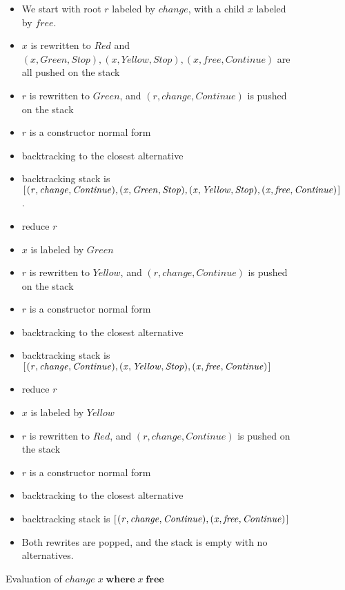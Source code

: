 \documentclass{book}
\theoremstyle{definition}
\newcommand{\Conid}[1]{\mathit{#1}}
\newcommand{\Varid}[1]{\mathit{#1}}
\begin{document}
\begin{figure}
\begin{itemize}
   \item We start with root \ensuremath{\Varid{r}} labeled by \ensuremath{\Varid{change}}, with a child \ensuremath{\Varid{x}} labeled by \ensuremath{\Varid{free}}.
   \item \ensuremath{\Varid{x}} is rewritten to \ensuremath{\Conid{Red}} and \ensuremath{(\Varid{x},\Conid{Green},\Conid{Stop}),(\Varid{x},\Conid{Yellow},\Conid{Stop}),(\Varid{x},\Varid{free},\Conid{Continue})} 
         are all pushed on the stack
   \item \ensuremath{\Varid{r}} is rewritten to \ensuremath{\Conid{Green}}, and \ensuremath{(\Varid{r},\Varid{change},\Conid{Continue})} is pushed on the stack
   \item \ensuremath{\Varid{r}} is a constructor normal form
   \item backtracking to the closest alternative
   \item backtracking stack is 
         \ensuremath{[\mskip1.5mu (\Varid{r},\Varid{change},\Conid{Continue}),(\Varid{x},\Conid{Green},\Conid{Stop}),(\Varid{x},\Conid{Yellow},\Conid{Stop}),(\Varid{x},\Varid{free},\Conid{Continue})\mskip1.5mu]}.
   \item reduce \ensuremath{\Varid{r}}
   \item \ensuremath{\Varid{x}} is labeled by \ensuremath{\Conid{Green}}
   \item \ensuremath{\Varid{r}} is rewritten to \ensuremath{\Conid{Yellow}}, and \ensuremath{(\Varid{r},\Varid{change},\Conid{Continue})} is pushed on the stack
   \item \ensuremath{\Varid{r}} is a constructor normal form
   \item backtracking to the closest alternative
   \item backtracking stack is 
         \ensuremath{[\mskip1.5mu (\Varid{r},\Varid{change},\Conid{Continue}),(\Varid{x},\Conid{Yellow},\Conid{Stop}),(\Varid{x},\Varid{free},\Conid{Continue})\mskip1.5mu]}
   \item reduce \ensuremath{\Varid{r}}
   \item \ensuremath{\Varid{x}} is labeled by \ensuremath{\Conid{Yellow}}
   \item \ensuremath{\Varid{r}} is rewritten to \ensuremath{\Conid{Red}}, and \ensuremath{(\Varid{r},\Varid{change},\Conid{Continue})} is pushed on the stack
   \item \ensuremath{\Varid{r}} is a constructor normal form
   \item backtracking to the closest alternative
   \item backtracking stack is 
         \ensuremath{[\mskip1.5mu (\Varid{r},\Varid{change},\Conid{Continue}),(\Varid{x},\Varid{free},\Conid{Continue})\mskip1.5mu]}
   \item Both rewrites are popped, and the stack is empty with no alternatives.
\end{itemize}
\caption{Evaluation of \ensuremath{\Varid{change}\;\Varid{x}\;\mathbf{where}\;\Varid{x}\;\textbf{free} }}
\label{fig:lightEval}
\end{figure}
\end{document}
